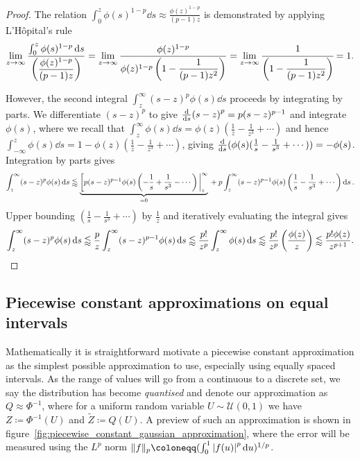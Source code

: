 \documentclass[manuscript,review]{acmart}
\begin{document}
\begin{proof}
The relation  $ \int_{0}^{z} \phi(s)^{1-p} \dd{s} \approx \tfrac{\phi(z)^{1-p}}{(p-1)z}  $ is demonstrated by applying L'H\^{o}pital's rule
\begin{equation*}
\lim_{z \to \infty} \dfrac{\int_{0}^{z} \phi(s)^{1-p} \dd{s}}{\left(\dfrac{\phi(z)^{1-p}}{(p-1)z}\right)} 
=  \lim_{z \to \infty} \dfrac{\phi(z)^{1-p}}{\phi(z)^{1-p}\left(1 - \dfrac{1}{(p-1)z^2} \right)} 
= \lim_{z \to \infty} \cfrac{1}{\left(1 - \dfrac{1}{(p-1)z^2}\right)} 
= 1.
\end{equation*}

However, the second integral $ \int_{z}^{\infty} (s-z)^p\phi(s) \dd{s} $ proceeds by integrating by parts. We differentiate $ (s-z)^p $ to give $ \dv{s} (s-z)^p = p (s-z)^{p-1} $ and integrate $ \phi(s) $, where we recall that $ \int_{z}^{\infty} \phi(s) \dd{s}  = \phi(z)(\tfrac{1}{z} - \tfrac{1}{z^3} + \cdots) $ and hence $ \int_{-\infty}^{z} \phi(s) \dd{s}  = 1 -\phi(z)(\tfrac{1}{z} - \tfrac{1}{z^3} + \cdots) $, giving $ {\dv{s}} (\phi(s)(\tfrac{1}{s} - \tfrac{1}{s^3} + \cdots))  = -\phi(s) $. Integration by parts gives
\begin{equation*}
\int_{z}^{\infty} (s-z)^p\phi(s) \dd{s} \lessapprox \underbrace{\eval[p(s-z)^{p-1}\phi(s)\left(-\dfrac{1}{s} + \dfrac{1}{s^3} - \cdots\right)|_{z}^{\infty}}_{{} = 0} {} + p \int_{z}^{\infty} (s-z)^{p-1} \phi(s) \left(\dfrac{1}{s} - \dfrac{1}{s^3} + \cdots\right) \dd{s}.
\end{equation*}
Upper bounding $ (\tfrac{1}{s} - \tfrac{1}{s^3} + \cdots )$ by $ \tfrac{1}{z} $ and iteratively evaluating the integral gives
\begin{equation*}
\int_{z}^{\infty} (s-z)^p\phi(s) \dd{s}
\lessapprox \dfrac{p}{z} \int_{z}^{\infty} (s-z)^{p-1} \phi(s) \dd{s} 
\lessapprox \dfrac{p!}{z^p} \int_{z}^{\infty} \phi(s) \dd{s} 
\lessapprox \dfrac{p!}{z^p} \left(\dfrac{\phi(z)}{z}\right) 
\lessapprox \frac{p!\phi(z)}{z^{p+1}}. \qedhere
\end{equation*}
\end{proof}

\subsection{Piecewise constant approximations on equal intervals}
\label{sec:piecewise_constant_approximations_on_equal_intervals}

Mathematically it is straightforward motivate a piecewise constant approximation as the simplest possible approximation to use, especially using equally spaced intervals. As the range of values will go from a continuous to a discrete set, we say the distribution has become \emph{quantised} and denote our approximation as $ Q \approx \Phi^{-1} $, where for a uniform random variable $ U \sim \mathcal{U}(0, 1)$ we have $ Z \coloneqq \Phi^{-1}(U) $ and $ \tilde{Z} \coloneqq Q(U) $. A preview of such an approximation is shown in figure~\ref{fig:piecewise_constant_gaussian_approximation}, where the error will be measured using the $ L^p $ norm $ \lVert f \rVert_p \coloneqq (\int_0^1 \abs{f(u)}^p \dd{u})^{1/p} $.
\end{document}
